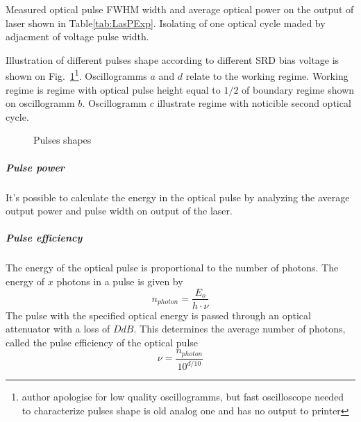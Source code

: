 Measured optical pulse FWHM width and average optical power on the
output of laser shown in Table\ref{tab:LasPExp}.  Isolating of one
optical cycle maded by adjacment of voltage pulse width.

\begin{table}[h]
  \centering
  \caption{Pulsed mode}
  \label{tab:LasPExp}
\end{table}

Illustration of different pulses shape according to different SRD bias
voltage is shown on Fig.~\ref{fig:LasPOsc}\footnote{author apologise
  for low quality oscillogramms, but fast oscilloscope needed to
  characterize pulses shape is old analog one and has no output to
  printer}.  Oscillogramms $a$ and $d$ relate to the working
regime. Working regime is regime with optical pulse height equal to
$1/2$ of boundary regime shown on oscillogramm $b$. Oscillogramm $c$
illustrate regime with noticible second optical cycle.

\begin{figure}
  \centering
  \caption{Pulses shapes}
  \label{fig:LasPOsc}
\end{figure}


\subparagraph{Pulse power}

It's possible to calculate the energy in the optical pulse by
analyzing the average output power and pulse width on output of the
laser.


\subparagraph{Pulse efficiency}

The energy of the optical pulse is proportional to the number of
photons.  The energy of $x$ photons in a pulse is given by
\begin{equation}
  n_{photon}=\frac{E_{o}}{h\cdot\nu}
\end{equation}
The pulse with the specified optical energy is passed through an
optical attenuator with a loss of $D dB$.  This determines the average
number of photons, called the pulse efficiency of the optical pulse
\begin{equation}
  \nu=\frac{n_{photon}}{10^{d/10}}
\end{equation}



